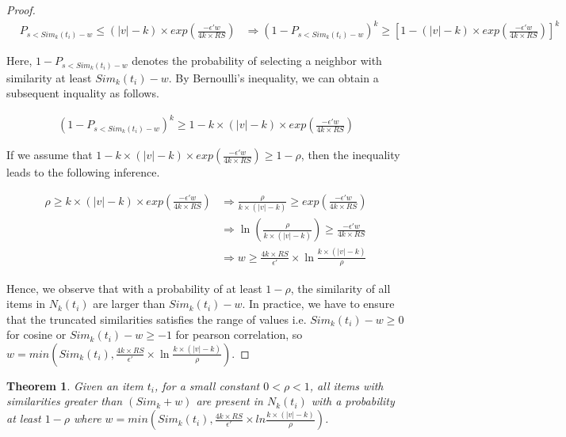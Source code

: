 \documentclass[11pt]{article}
\theoremstyle{plain}
\newtheorem{theorem}{Theorem}
\theoremstyle{definition}
\begin{document}
\begin{proof}
\begin{align*}
&P_{s < Sim_k(t_i) - w} \leq (\lvert v \rvert - k) \times exp(\frac{- \epsilon' w}{4k \times RS}) 
&\Longrightarrow
(1 - P_{s < Sim_k(t_i) - w})^k \geq [1 - (\lvert v \rvert - k) \times exp(\frac{-\epsilon' w}{4k \times RS})]^k
\end{align*}

Here, $1 - P_{s < Sim_k(t_i) - w}$ denotes the probability of selecting a neighbor with similarity at least $Sim_k(t_i) - w$. 
By Bernoulli's inequality, we can obtain a subsequent inquality as follows.

\begin{align}
(1 - P_{s < Sim_k(t_i) - w})^k \geq 1 - k \times (\lvert v \rvert -k) \times exp(\frac{-\epsilon' w}{4k \times RS})
\end{align}

If we assume that $1 - k \times (\lvert v \rvert - k) \times exp(\frac{-\epsilon' w}{4k \times RS}) \geq 1 - \rho$, then the inequality leads to the following inference.

\begin{align*}
\rho \geq k \times (\lvert v \rvert - k) \times exp(\frac{-\epsilon' w}{4k \times RS}) 
& \Longrightarrow
\frac{\rho}{k \times (\lvert v \rvert - k)} \geq exp(\frac{-\epsilon' w}{4k \times RS}) \\
&\Longrightarrow
\ln(\frac{\rho}{k \times (\lvert v \rvert - k)}) \geq \frac{-\epsilon' w}{4k \times RS} \\
& \Longrightarrow
w \geq \frac{4k \times RS}{\epsilon'} \times \ln \frac{k\times (\lvert v \rvert - k)}{\rho}
\end{align*}


Hence, we observe that with a probability of at least $1 - \rho$, the similarity of all items in $N_k(t_i)$ are larger than $Sim_k(t_i) - w$.
In practice, we have to ensure that the truncated similarities satisfies the range of values i.e.
$Sim_k(t_i) -w \geq 0$ for cosine or $Sim_k(t_i) -w \geq -1$ for pearson correlation, so $w = min(Sim_k(t_i), \frac{4k \times RS}{\epsilon'} \times \ln \frac{k \times (\lvert v \rvert - k)}{\rho})$.

\end{proof}


\begin{theorem}
Given an item $t_i$, for a small constant   $0 <\rho <1$, all items with similarities greater than $(Sim_k +w)$ are present in $N_k(t_i)$ with a probability at least $1-\rho$ where $w=min(Sim_k(t_i), \frac{4k \times RS}{\epsilon'} \times ln\frac{k \times (|v| - k)}{\rho})$.
\end{theorem}
\end{document}
